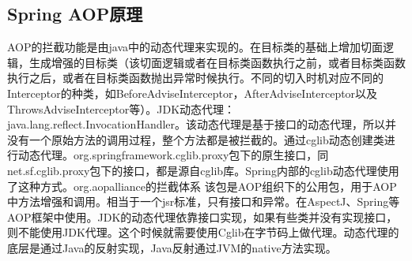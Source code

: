 \documentclass[../../../interview-questions.tex]{subfiles}
\begin{document}
\subsection{Spring AOP原理}

AOP的拦截功能是由java中的动态代理来实现的。在目标类的基础上增加切面逻辑，生成增强的目标类（该切面逻辑或者在目标类函数执行之前，或者目标类函数执行之后，或者在目标类函数抛出异常时候执行。不同的切入时机对应不同的Interceptor的种类，如BeforeAdviseInterceptor，AfterAdviseInterceptor以及ThrowsAdviseInterceptor等）。JDK动态代理：java.lang.reflect.InvocationHandler。该动态代理是基于接口的动态代理，所以并没有一个原始方法的调用过程，整个方法都是被拦截的。通过cglib动态创建类进行动态代理。org.springframework.cglib.proxy包下的原生接口，同net.sf.cglib.proxy包下的接口，都是源自cglib库。Spring内部的cglib动态代理使用了这种方式。org.aopalliance的拦截体系
该包是AOP组织下的公用包，用于AOP中方法增强和调用。相当于一个jsr标准，只有接口和异常。在AspectJ、Spring等AOP框架中使用。JDK的动态代理依靠接口实现，如果有些类并没有实现接口，则不能使用JDK代理。这个时候就需要使用Cglib在字节码上做代理。动态代理的底层是通过Java的反射实现，Java反射通过JVM的native方法实现。
\end{document}
